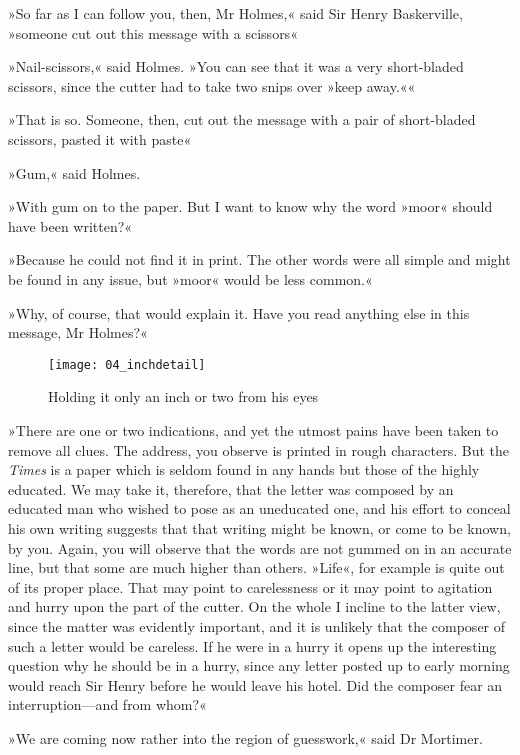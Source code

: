 »So far as I can follow you, then, Mr Holmes,« said Sir Henry Baskerville, »someone cut out this message with a scissors\longdash«

»Nail-scissors,« said Holmes. »You can see that it was a very short-bladed scissors, since the cutter had to take two snips over »keep away.««

»That is so. Someone, then, cut out the message with a pair of short-bladed scissors, pasted it with paste\longdash«

»Gum,« said Holmes.

»With gum on to the paper. But I want to know why the word »moor« should have been written?«

»Because he could not find it in print. The other words were all simple and might be found in any issue, but »moor« would be less common.«

»Why, of course, that would explain it. Have you read anything else in this message, Mr Holmes?«

\begin{figure}[tbhp]
\centering
\texttt{[image: 04\_inchdetail]}
\caption{Holding it only an inch or two from his eyes}
\end{figure}

»There are one or two indications, and yet the utmost pains have been taken to remove all clues. The address, you observe is printed in rough characters. But the \textit{Times} is a paper which is seldom found in any hands but those of the highly educated. We may take it, therefore, that the letter was composed by an educated man who wished to pose as an uneducated one, and his effort to conceal his own writing suggests that that writing might be known, or come to be known, by you. Again, you will observe that the words are not gummed on in an accurate line, but that some are much higher than others. »Life«, for example is quite out of its proper place. That may point to carelessness or it may point to agitation and hurry upon the part of the cutter. On the whole I incline to the latter view, since the matter was evidently important, and it is unlikely that the composer of such a letter would be careless. If he were in a hurry it opens up the interesting question why he should be in a hurry, since any letter posted up to early morning would reach Sir Henry before he would leave his hotel. Did the composer fear an interruption—and from whom?«

»We are coming now rather into the region of guesswork,« said Dr Mortimer.

